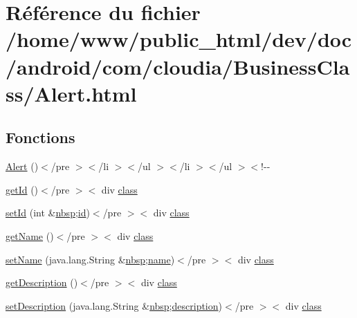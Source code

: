\hypertarget{_alert_8html}{\section{Référence du fichier /home/www/public\-\_\-html/dev/doc/android/com/cloudia/\-Business\-Class/\-Alert.html}
\label{_alert_8html}
}
\subsection*{Fonctions}
\begin{DoxyCompactItemize}
\item 
\hyperlink{_alert_8html_a07a8fa24dcbee036e6ee7bf3402dc082}{Alert} ()$<$/pre $>$$<$/li $>$$<$/ul $>$$<$/li $>$$<$/ul $>$$<$!-\/-\/
\item 
\hyperlink{_alert_8html_a4d6d40d7ea4e4bbe013741181989d073}{get\-Id} ()$<$/pre $>$$<$ div \hyperlink{_tools_8html_acf06f836132665ba8114f5a414c2403f}{class}
\item 
\hyperlink{_alert_8html_ad3d1c59471651f6b599a848d6d31e3b7}{set\-Id} (int \&\hyperlink{_tools_8html_aef915316f784c9063d942974538301a6}{nbsp};\hyperlink{index-9_8html_aa9b8ff1d03b739d1e752b9d9a5aa7c98}{id})$<$/pre $>$$<$ div \hyperlink{_tools_8html_acf06f836132665ba8114f5a414c2403f}{class}
\item 
\hyperlink{_alert_8html_ae226f787d4e360f744a020d0f88b1310}{get\-Name} ()$<$/pre $>$$<$ div \hyperlink{_tools_8html_acf06f836132665ba8114f5a414c2403f}{class}
\item 
\hyperlink{_alert_8html_a99f0912a0517b9894a150e107a7957a3}{set\-Name} (java.\-lang.\-String \&\hyperlink{_tools_8html_aef915316f784c9063d942974538301a6}{nbsp};\hyperlink{_cloudia_d_b_8html_ab74e6bf80237ddc4109968cedc58c151}{name})$<$/pre $>$$<$ div \hyperlink{_tools_8html_acf06f836132665ba8114f5a414c2403f}{class}
\item 
\hyperlink{_alert_8html_a988f4af0cb655487c31bf5169c4437c7}{get\-Description} ()$<$/pre $>$$<$ div \hyperlink{_tools_8html_acf06f836132665ba8114f5a414c2403f}{class}
\item 
\hyperlink{_alert_8html_a6697b38ff295440af41346e89c0ac298}{set\-Description} (java.\-lang.\-String \&\hyperlink{_tools_8html_aef915316f784c9063d942974538301a6}{nbsp};\hyperlink{_cloudia_d_b_8html_a2661f439a4a94ffdcd5e47ae1da0bb1d}{description})$<$/pre $>$$<$ div \hyperlink{_tools_8html_acf06f836132665ba8114f5a414c2403f}{class}
\end{DoxyCompactItemize}
